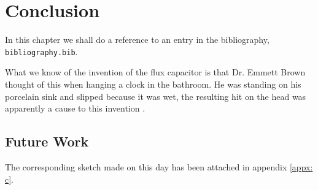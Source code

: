 \section{Conclusion}
\label{sec:section5}

\noindent In this chapter we shall do a reference to an entry in the bibliography, \texttt{bibliography.bib}. 

What we know of the invention of the flux capacitor is that Dr. Emmett Brown thought of this when hanging a clock in the bathroom. He was standing on his porcelain sink and slipped because it was wet, the resulting hit on the head was apparently a cause to this invention \cite{olmeda2021towards}. 

\subsection{Future Work}
The corresponding sketch made on this day has been attached in appendix \ref{appx: c}.

